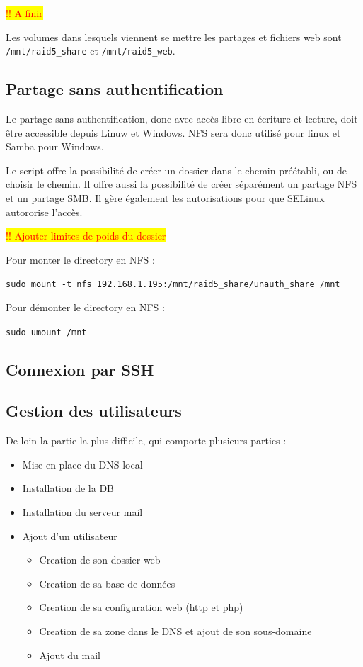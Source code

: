\documentclass{article}
\begin{document}
	\colorbox{yellow}{\textcolor{red}{!! A finir}}
	

Les volumes dans lesquels viennent se mettre les partages et fichiers web sont \texttt{/mnt/raid5\_share} et \texttt{/mnt/raid5\_web}.

\subsection{Partage sans authentification}

Le partage sans authentification, donc avec accès libre en écriture et lecture, doit être accessible depuis Linuw et Windows. NFS sera donc utilisé pour linux et Samba pour Windows. 

Le script offre la possibilité de créer un dossier dans le chemin préétabli, ou de choisir le chemin. Il offre aussi la possibilité de créer séparément un partage NFS et un partage SMB. Il gère également les autorisations pour que SELinux autororise l'accès.

\colorbox{yellow}{\textcolor{red}{!! Ajouter limites de poids du dossier}}

Pour monter le directory en NFS :

\texttt{sudo mount -t nfs 192.168.1.195:/mnt/raid5\_share/unauth\_share /mnt}

Pour démonter le directory en NFS :

\texttt{sudo umount /mnt}


\subsection{Connexion par SSH}
\subsection{Gestion des utilisateurs}

De loin la partie la plus difficile, qui comporte plusieurs parties :
\begin{itemize}
\item Mise en place du DNS local
\item Installation de la DB
\item Installation du serveur mail
\item Ajout d'un utilisateur
\begin{itemize}
\item Creation de son dossier web
\item Creation de sa base de données
\item Creation de sa configuration web (http et php)
\item Creation de sa zone dans le DNS et ajout de son sous-domaine
\item Ajout du mail
\end{itemize}
\end{itemize}
\end{document}
